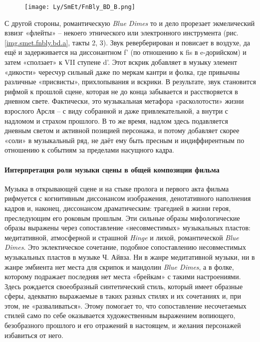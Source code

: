 \begin{figure}
\centering
\texttt{[image: Ly/SmEt/FnBly\_BD\_B.png]}
\caption{}\label{img.smet.fnbly.bd.b}
\end{figure}

С другой стороны, романтическую \emph{Blue Dimes} то и дело прорезает экмелический взвизг «флейты» -- некоего этнического или электронного инструмента (рис. \ref{img.smet.fnbly.bd.a}, такты 2, 3).
Звук реверберирован и повисает в воздухе, да ещё и задерживается на диссонантном f' (по отношению к fis в e-дорийском) и затем «сползает» к VII ступене d'.
Этот вскрик добавляет в музыку элемент «дикости» чересчур сильный даже по меркам кантри и фолка, где привычны различные «присвисты», прихлопывания и вскрики.
В результате, звук становится рифмой к прошлой сцене, которая не до конца забывается и расстворяется в дневном свете.
Фактически, это музыкальная метафора «расколотости» жизни взрослого Арсля -- с виду собранной и даже привлекательной, а внутри с надломом и страхом прошлого.
В то же время, надлом здесь подавляется дневным светом и активной позицией персонажа, и потому добавляет скорее «соли» в музыкальный ряд, не даёт ему быть пресным и индиффирентным по отношению к событиям за пределами насущного кадра.

\paragraph{Интерпретация роли музыки сцены в общей композиции фильма}\label{ux438ux43dux442ux435ux440ux43fux440ux435ux442ux430ux446ux438ux44f-ux440ux43eux43bux438-ux43cux443ux437ux44bux43aux438-ux441ux446ux435ux43dux44b-ux432-ux43eux431ux449ux435ux439-ux43aux43eux43cux43fux43eux437ux438ux446ux438ux438-ux444ux438ux43bux44cux43cux430-1}

Музыка в открывающей сцене и на стыке пролога и первого акта фильма рифмуется с когнитивным диссонансом изображения, денотативного наполнения кадров и, наконец, диссонансом драматическим: трагедией в жизни героя, преследующим его роковым прошлым.
Эти сильные образы мифологические образы выражены через сопоставление «несовместимых» музыкальных пластов: медитативной, атмосферной и страшной \emph{Hinge} и лихой, романтической \emph{Blue Dimes}.
Это эклектическое сочетание, подобное сопоставлению несовместимых музыкальных пластов в музыке Ч. Айвза.
Ни в жанре медитативной музыки, ни в жанре эмбиента нет места для скрипок и мандолин \emph{Blue Dimes}, а в фолке, которому подражает последняя нет места «брейкам» с такими настроениями.
Здесь рождается своеобразный синтетический стиль, который имеет образные сферы, адекватно выражаемые в таких разных стилях и их сочетаниях и, при этом, не «разваливаться».
Этому помогает то, что сопоставление несочетаемых стилей само по себе оказывается художественным выражением вопиющего, безобразного прошлого и его отражений в настоящем, и желания персонажей избавиться от него.

